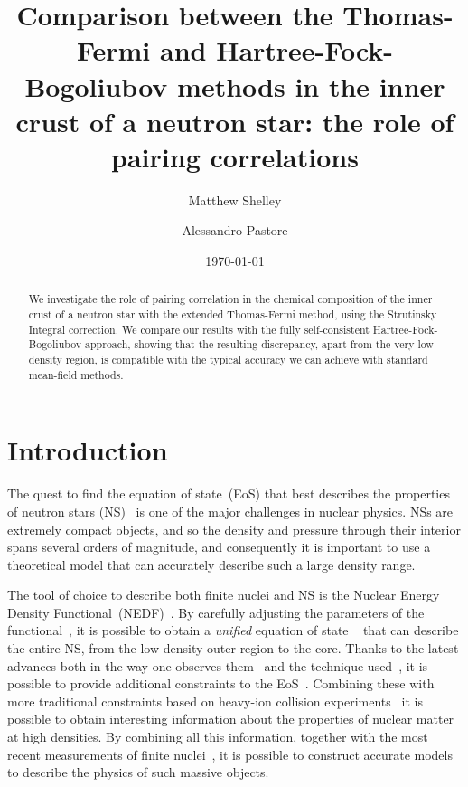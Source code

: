 \documentclass[
    amsmath,amssymb,
    aps,
    prc,
    floatfix,
]{revtex4-2}
\begin{document}
\preprint{}

\title{Comparison between the Thomas-Fermi and Hartree-Fock-Bogoliubov methods in the inner crust of a neutron star: the role of pairing correlations}

\author{Matthew Shelley}
\author{Alessandro Pastore}

\date{\today}

\begin{abstract}
We investigate the role of pairing correlation in the chemical composition of the inner crust of a neutron star with the extended Thomas-Fermi method, using the Strutinsky Integral correction. We compare our results with the fully self-consistent Hartree-Fock-Bogoliubov approach, showing that the resulting discrepancy, apart from the very low density region, is compatible with the typical accuracy we can achieve with standard mean-field methods.
\end{abstract}

\maketitle


\section{Introduction}\label{sec:intro}

The quest to find the equation of state~(EoS) that best describes the properties of neutron stars (NS)~\cite{chamel2008physics} is one of the major challenges in nuclear physics. NSs are extremely compact objects, and so the density and pressure through their interior spans several orders of magnitude, and consequently it is important to use a theoretical model that can accurately describe such a large density range.

The tool of choice to describe both finite nuclei and NS is the Nuclear Energy Density Functional~(NEDF)~\cite{Book:Reinhard2004}. By carefully adjusting the parameters of the functional~\cite{Goriely2009}, it is possible to obtain a \emph{unified} equation of state ~\cite{pearsonUnifiedEquationsState2018} that can describe the entire NS, from the low-density outer region to the core.
Thanks to the latest advances both in the way one observes them~\cite{gendreau2012neutron} and the technique used~\cite{abbott2017gw170817}, it is possible to provide additional constraints to the EoS~\cite{most2018new,blaschkePhasesDenseMatter2018}. Combining these with more traditional constraints based on heavy-ion collision experiments~\cite{stoecker1986high,danielewicz2002determination} it is possible to obtain interesting information about the properties of nuclear matter at high densities. By combining all this information, together with the most recent measurements of finite nuclei~\cite{Steiner2008}, it is possible to construct accurate models to describe the physics of such massive objects.
\end{document}
